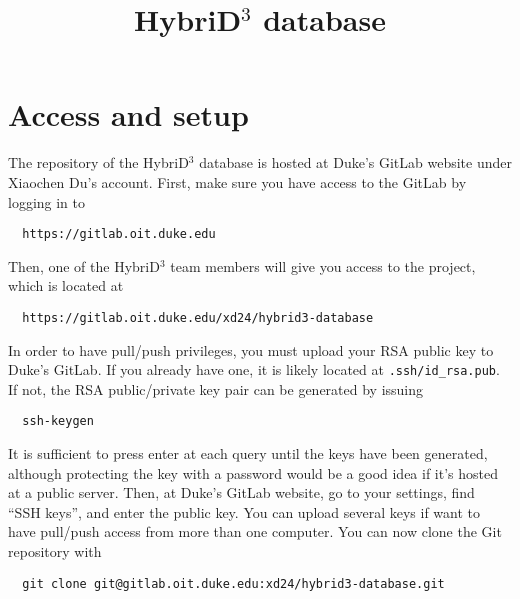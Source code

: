\documentclass{article}
\title{HybriD$^3$ database}
\begin{document}
\maketitle

\section{Access and setup}

The repository of the HybriD$^3$ database is hosted at Duke's GitLab website under Xiaochen Du's account. First, make sure you have access to the GitLab by logging in to
\lstset{language=Bash}
\begin{lstlisting}
  https://gitlab.oit.duke.edu
\end{lstlisting}
Then, one of the HybriD$^3$ team members will give you access to the project, which is located at
\begin{lstlisting}
  https://gitlab.oit.duke.edu/xd24/hybrid3-database
\end{lstlisting}
In order to have pull/push privileges, you must upload your RSA public key to Duke's GitLab. If you already have one, it is likely located at \verb+.ssh/id_rsa.pub+. If not, the RSA public/private key pair can be generated by issuing
\begin{lstlisting}
  ssh-keygen
\end{lstlisting}
It is sufficient to press enter at each query until the keys have been generated, although protecting the key with a password would be a good idea if it's hosted at a public server. Then, at Duke's GitLab website, go to your settings, find ``SSH keys'', and enter the public key. You can upload several keys if want to have pull/push access from more than one computer. You can now clone the Git repository with
\begin{lstlisting}
  git clone git@gitlab.oit.duke.edu:xd24/hybrid3-database.git
\end{lstlisting}
\end{document}
